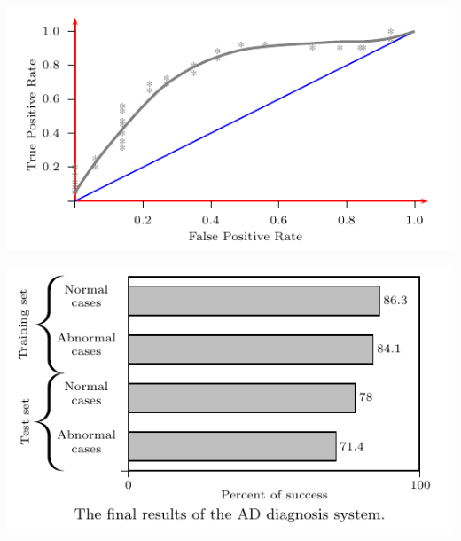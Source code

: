\documentclass[portrait]{xebaposter}
\newcommand{\compresslist}{%
 \setlength{\itemsep}{1pt}%
 \setlength{\parskip}{0pt}%
 \setlength{\parsep}{0pt}%
 }
\begin{document}
\begin{poster}
{\begin{multicols}{2}
\centerline{\includegraphics[scale=.7]{fig6}}
\centerline{\includegraphics[scale=.7]{fig5}}

\end{multicols}
}




\end{poster}
\end{document}
